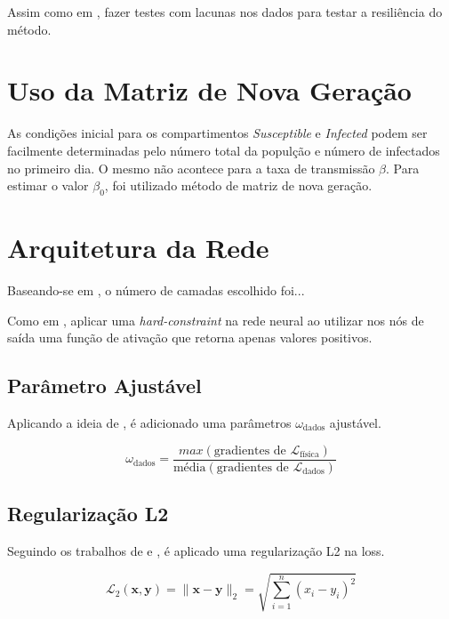 Assim como em \cite{ghosh-etal:23-subnotificacao}, fazer testes com lacunas
nos dados para testar a resiliência do método.

\section{Uso da Matriz de Nova Geração}

As condições inicial para os compartimentos \textit{Susceptible} e \textit{Infected}
podem ser facilmente determinadas pelo número total da populção e número de infectados
no primeiro dia. O mesmo não acontece para a taxa de transmissão $\beta$. Para 
estimar o valor $\beta_0$, foi utilizado método de matriz de nova geração.

\section{Arquitetura da Rede}

Baseando-se em \cite{shaier-etal:22-dinns}, o número de camadas escolhido foi...

Como em \cite{millevoi-etal:24-split-join-pinns}, aplicar uma 
\textit{hard-constraint} na rede neural ao utilizar nos nós de saída
uma função de ativação que retorna apenas valores positivos.

\subsection{Parâmetro  Ajustável}

Aplicando a ideia de \cite{shamsara-etal:25-omicron}, é adicionado uma parâmetros
$\omega_{\text{dados}}$ ajustável. 

\begin{equation}\label{eq:lambda-aprendivel}
    \omega_{\text{dados}} = \frac{max(\text{gradientes de }\mathcal{L}_{\text{física}})}{\text{média}(\text{gradientes de }\mathcal{L}_{\text{dados}})}
\end{equation}

\subsection{Regularização L2}

Seguindo os trabalhos de \cite{long-etal:21-L2} e \cite{shamsara-etal:25-omicron},
é aplicado uma regularização L2 na loss.

\begin{equation}\label{eq:regularizacao-L2}
    \mathcal{L}_2(\mathbf{x}, \mathbf{y}) = \|\mathbf{x} - \mathbf{y}\|_2 = \sqrt{\sum_{i=1}^{n} (x_i - y_i)^2}
\end{equation}

